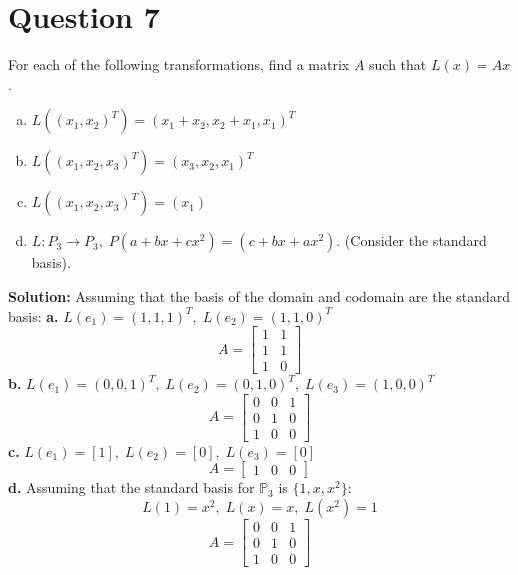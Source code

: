 \documentclass{article}
\begin{document}
\newpage
\section*{Question 7}
For each of the following transformations, find a matrix $A$ such that $L(x) = Ax$.
\begin{enumerate}[a.]
    \item $L((x_1, x_2)^T) = (x_1 + x_2, x_2 + x_1, x_1)^T$
    \item $L((x_1, x_2, x_3)^T) = (x_3, x_2, x_1)^T$
    \item $L((x_1, x_2, x_3)^T) = (x_1)$
    \item $L : P_3 \rightarrow P_3, \; P(a + bx + cx^2) = (c + bx + ax^2)$. (Consider the standard basis).
\end{enumerate}

\noindent\textbf{Solution:} Assuming that the basis of the domain and codomain are the standard basis:
\newline\noindent\textbf{a.}
$ L(e_1) = (1, 1, 1)^T, \; L(e_2) = (1, 1, 0)^T $
$$ A = \begin{bmatrix} 1 & 1 \\ 1 & 1 \\ 1 & 0 \end{bmatrix} $$
\textbf{b.}
$ L(e_1) = (0, 0, 1)^T, \; L(e_2) = (0, 1, 0)^T, \; L(e_3) = (1, 0, 0)^T $
$$ A = \begin{bmatrix} 0 & 0 & 1 \\ 0 & 1 & 0 \\ 1 & 0 & 0 \end{bmatrix} $$
\textbf{c.}
$ L(e_1) = [1], \; L(e_2) = [0], \; L(e_3) = [0] $
$$ A = \begin{bmatrix} 1 & 0 & 0 \end{bmatrix} $$
\textbf{d.}
Assuming that the standard basis for $\mathbb{P}_3$ is $\{1, x, x^2\}$:
$$ L(1) = x^2, \; L(x) = x, \; L(x^2) = 1 $$
$$ A = \begin{bmatrix} 0 & 0 & 1 \\ 0 & 1 & 0 \\ 1 & 0 & 0 \end{bmatrix} $$

\newpage
\end{document}
